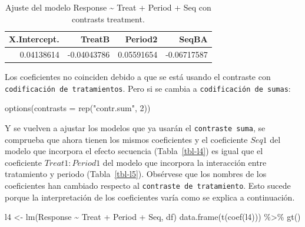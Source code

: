 \documentclass[
  12pt,
  a4paper,
  extrafontsizes,
  onecolumn,
  openright,
  table]{memoir}
\newenvironment{Shaded}{\begin{snugshade}}{\end{snugshade}}
\newcommand{\AttributeTok}[1]{\textcolor[rgb]{0.40,0.45,0.13}{#1}}
\newcommand{\DecValTok}[1]{\textcolor[rgb]{0.68,0.00,0.00}{#1}}
\newcommand{\FunctionTok}[1]{\textcolor[rgb]{0.28,0.35,0.67}{#1}}
\newcommand{\NormalTok}[1]{\textcolor[rgb]{0.00,0.23,0.31}{#1}}
\newcommand{\OtherTok}[1]{\textcolor[rgb]{0.00,0.23,0.31}{#1}}
\newcommand{\SpecialCharTok}[1]{\textcolor[rgb]{0.37,0.37,0.37}{#1}}
\newcommand{\StringTok}[1]{\textcolor[rgb]{0.13,0.47,0.30}{#1}}
\begin{document}
\hypertarget{tbl-l3}{}
\begin{longtable}{rrrr}
\caption{\label{tbl-l3}Ajuste del modelo Response \textasciitilde{} Treat + Period + Seq con
contrasts treatment. }\tabularnewline

\toprule
X.Intercept. & TreatB & Period2 & SeqBA \\ 
\midrule
0.04138614 & -0.04043786 & 0.05591654 & -0.06717587 \\ 
\bottomrule
\end{longtable}

\normalsize

Los coeficientes no coinciden debido a que se está usando el contraste
con \texttt{codificación\ de\ tratamientos}. Pero si se cambia a
\texttt{codificación\ de\ sumas}:

\scriptsize

\begin{Shaded}
\begin{Highlighting}[]
\FunctionTok{options}\NormalTok{(}\AttributeTok{contrasts =} \FunctionTok{rep}\NormalTok{(}\StringTok{"contr.sum"}\NormalTok{, }\DecValTok{2}\NormalTok{))}
\end{Highlighting}
\end{Shaded}

\normalsize

Y se vuelven a ajustar los modelos que ya usarán el
\texttt{contraste\ suma}, se comprueba que ahora tienen los mismos
coeficientes y el coeficiente \(Seq1\) del modelo que incorpora el
efecto secuencia (Tabla~\ref{tbl-l4}) es igual que el coeficiente
\(Treat1:Period1\) del modelo que incorpora la interacción entre
tratamiento y periodo (Tabla~\ref{tbl-l5}). Obsérvese que los nombres de
los coeficientes han cambiado respecto al
\texttt{contraste\ de\ tratamiento}. Esto sucede porque la
interpretación de los coeficientes varía como se explica a continuación.

\scriptsize

\begin{Shaded}
\begin{Highlighting}[]
\NormalTok{l4 }\OtherTok{\textless{}{-}} \FunctionTok{lm}\NormalTok{(Response }\SpecialCharTok{\textasciitilde{}}\NormalTok{ Treat }\SpecialCharTok{+}\NormalTok{ Period }\SpecialCharTok{+}\NormalTok{ Seq, df)}
\FunctionTok{data.frame}\NormalTok{(}\FunctionTok{t}\NormalTok{(}\FunctionTok{coef}\NormalTok{(l4))) }\SpecialCharTok{\%\textgreater{}\%} \FunctionTok{gt}\NormalTok{()}
\end{Highlighting}
\end{Shaded}
\end{document}
